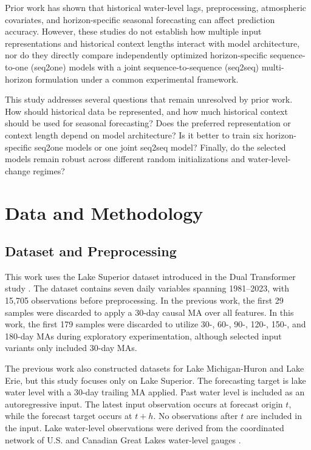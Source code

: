\documentclass[conference]{IEEEtran}
\begin{document}
Prior work has shown that historical water-level lags, preprocessing, atmospheric covariates, and horizon-specific seasonal forecasting can affect prediction accuracy. However, these studies do not establish how multiple input representations and historical context lengths interact with model architecture, nor do they directly compare independently optimized horizon-specific sequence-to-one (seq2one) models with a joint sequence-to-sequence (seq2seq) multi-horizon formulation under a common experimental framework.

This study addresses several questions that remain unresolved by prior work. How should historical data be represented, and how much historical context should be used for seasonal forecasting? Does the preferred representation or context length depend on model architecture? Is it better to train six horizon-specific seq2one models or one joint seq2seq model? Finally, do the selected models remain robust across different random initializations and water-level-change regimes?


\section{Data and Methodology}

\subsection{Dataset and Preprocessing}

This work uses the Lake Superior dataset introduced in the Dual Transformer study \cite{chen2025dualtransformer}. The dataset contains seven daily variables spanning 1981--2023, with 15,705 observations before preprocessing. In the previous work, the first 29 samples were discarded to apply a 30-day causal MA over all features. In this work, the first 179 samples were discarded to utilize 30-, 60-, 90-, 120-, 150-, and 180-day MAs during exploratory experimentation, although selected input variants only included 30-day MAs.

The previous work also constructed datasets for Lake Michigan-Huron and Lake Erie, but this study focuses only on Lake Superior. The forecasting target is lake water level with a 30-day trailing MA applied. Past water level is included as an autoregressive input. The latest input observation occurs at forecast origin $t$, while the forecast target occurs at $t+h$. No observations after $t$ are included in the input. Lake water-level observations were derived from the coordinated network of U.S. and Canadian Great Lakes water-level gauges \cite{noaa2026waterlevels,usace2026waterlevels}.
\end{document}
